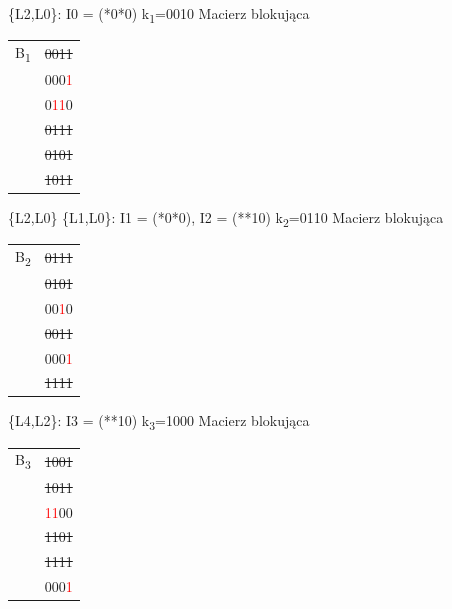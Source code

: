 \documentclass[]{article}
\begin{document}
\{L2,L0\}: I0 = (*0*0)
\newline
\newline
k\textsubscript{1}=0010
\newline
Macierz blokująca
\newline
\begin{tabular}[r]{|c|c|}
\hline
    B\textsubscript{1} & \sout{0011} \\
      & 000\textcolor{red}{1} \\
      & 0\textcolor{red}{1}\textcolor{red}{1}0 \\
      & \sout{0111} \\
      & \sout{0101} \\
      & \sout{1011} \\
 \hline 
\end{tabular}
\newline
\newline
\{L2,L0\} \{L1,L0\}: I1 = (*0*0), I2 = (**10)
\newline
\newline
k\textsubscript{2}=0110
\newline
Macierz blokująca
\newline
\begin{tabular}[r]{|c|c|}
\hline
    B\textsubscript{2} & \sout{0111} \\
      & \sout{0101} \\
      & 00\textcolor{red}{1}0 \\
      & \sout{0011} \\
      & 000\textcolor{red}{1} \\
      & \sout{1111} \\
\hline 
\end{tabular}
\newline
\newline
\{L4,L2\}: I3 = (**10)
\newpage
k\textsubscript{3}=1000
\newline
Macierz blokująca
\newline
\begin{tabular}[r]{|c|c|}
\hline
    B\textsubscript{3} & \sout{1001} \\
      & \sout{1011} \\
      & \textcolor{red}{1}\textcolor{red}{1}00 \\
      & \sout{1101} \\
      & \sout{1111} \\
      & 000\textcolor{red}{1} \\
 \hline 
\end{tabular}
\newline
\end{document}
